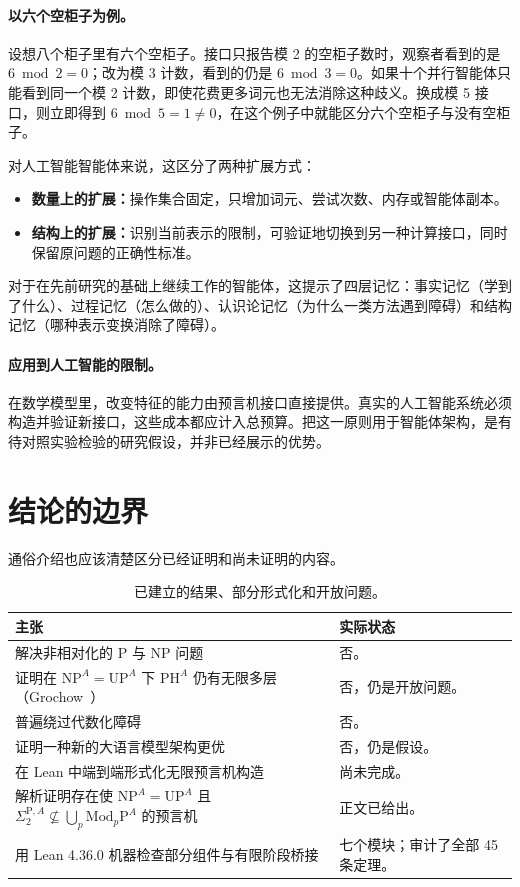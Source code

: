 \documentclass[11pt,a4paper]{article}
\newcommand{\NP}{\mathrm{NP}}
\newcommand{\UP}{\mathrm{UP}}
\newcommand{\MP}[1]{\mathrm{Mod}_{#1}\mathrm P}
\newcommand{\Sig}{\Sigma_2^{\mathrm P,A}}
\begin{document}
\paragraph{以六个空柜子为例。}
设想八个柜子里有六个空柜子。接口只报告模 2 的空柜子数时，观察者看到的是 $6\bmod 2=0$；改为模 3 计数，看到的仍是 $6\bmod 3=0$。如果十个并行智能体只能看到同一个模 2 计数，即使花费更多词元也无法消除这种歧义。换成模 5 接口，则立即得到 $6\bmod 5=1\ne0$，在这个例子中就能区分六个空柜子与没有空柜子。

对人工智能智能体来说，这区分了两种扩展方式：
\begin{itemize}
\item \textbf{数量上的扩展：}操作集合固定，只增加词元、尝试次数、内存或智能体副本。
\item \textbf{结构上的扩展：}识别当前表示的限制，可验证地切换到另一种计算接口，同时保留原问题的正确性标准。
\end{itemize}

对于在先前研究的基础上继续工作的智能体，这提示了四层记忆：事实记忆（学到了什么）、过程记忆（怎么做的）、认识论记忆（为什么一类方法遇到障碍）和结构记忆（哪种表示变换消除了障碍）。

\paragraph{应用到人工智能的限制。}
在数学模型里，改变特征的能力由预言机接口直接提供。真实的人工智能系统必须构造并验证新接口，这些成本都应计入总预算。把这一原则用于智能体架构，是有待对照实验检验的研究假设，并非已经展示的优势。

\section{结论的边界}
通俗介绍也应该清楚区分已经证明和尚未证明的内容。

\begin{table}[htbp]\small\centering
\begin{tabularx}{\linewidth}{@{}>{\raggedright\arraybackslash}p{.63\linewidth} >{\raggedright\arraybackslash}X@{}}
\toprule 主张 & 实际状态\\\midrule
解决非相对化的 $\mathrm P$ 与 $\NP$ 问题~\cite{cook} & 否。\\
证明在 $\NP^A=\UP^A$ 下 $\mathrm{PH}^A$ 仍有无限多层（Grochow~\cite{grochow}） & 否，仍是开放问题。\\
普遍绕过代数化障碍 & 否。\\
证明一种新的大语言模型架构更优 & 否，仍是假设。\\
在 Lean 中端到端形式化无限预言机构造 & 尚未完成。\\
解析证明存在使 $\NP^A=\UP^A$ 且 $\Sig\not\subseteq\bigcup_p\MP p^A$ 的预言机 & 正文已给出。\\
用 Lean 4.36.0 机器检查部分组件与有限阶段桥接 & 七个模块；审计了全部 45 条定理。\\
\bottomrule
\end{tabularx}
\caption{已建立的结果、部分形式化和开放问题。}
\end{table}
\end{document}
